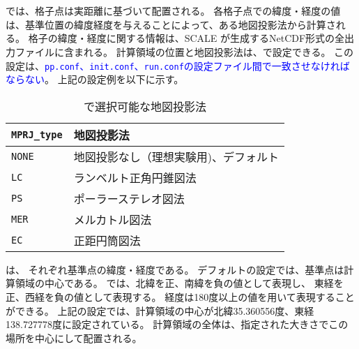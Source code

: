 \section{\SecMapprojectionSetting} \label{subsec:adv_mapproj}
\scalerm では、格子点は実距離に基づいて配置される。
各格子点での緯度・経度の値は、基準位置の緯度経度を与えることによって、ある地図投影法から計算される。
格子の緯度・経度に関する情報は、SCALE が生成するNetCDF形式の全出力ファイルに含まれる。
計算領域の位置と地図投影法は、で設定できる。
この設定は、\textcolor{blue}{\texttt{pp.conf}、\texttt{init.conf}、\texttt{run.conf}の設定ファイル間で一致させなければならない}。
上記の設定例を以下に示す。

\begin{table}[h]
\begin{center}
\caption{\scalerm で選択可能な地図投影法}
\begin{tabularx}{150mm}{|l|X|} \hline
 \rowcolor[gray]{0.9} \verb|MPRJ_type| & 地図投影法 \\ \hline
 \verb|NONE| & 地図投影なし（理想実験用)、デフォルト \\ \hline
 \verb|LC|   & ランベルト正角円錐図法              \\ \hline
 \verb|PS|   & ポーラーステレオ図法                \\ \hline
 \verb|MER|  & メルカトル図法                     \\ \hline
 \verb|EC|   & 正距円筒図法                       \\ \hline
\end{tabularx}
\label{tab:map_proj}
\end{center}
\end{table}

\noindent
{}は、
それぞれ基準点の緯度・経度である。
デフォルトの設定では、基準点は計算領域の中心である。
\scalerm では、北緯を正、南緯を負の値として表現し、
東経を正、西経を負の値として表現する。
経度は180度以上の値を用いて表現することができる。
上記の設定では、計算領域の中心が北緯35.360556度、東経138.727778度に設定されている。
計算領域の全体は、指定された大きさでこの場所を中心にして配置される。

